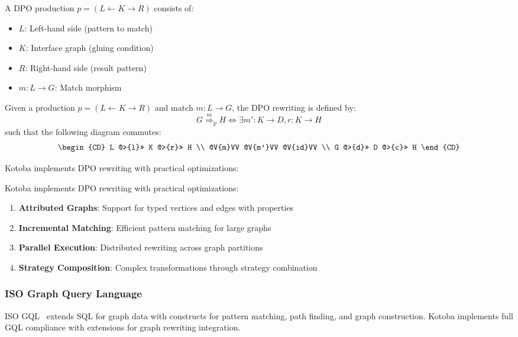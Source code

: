 \documentclass[11pt,a4paper]{article}
\begin{document}
\begin{definition}
A DPO production $p = (L \leftarrow K \rightarrow R)$ consists of:
\begin{itemize}
\item $L$: Left-hand side (pattern to match)
\item $K$: Interface graph (gluing condition)
\item $R$: Right-hand side (result pattern)
\item $m: L \rightarrow G$: Match morphism
\end{itemize}
\end{definition}

\begin{theorem}
Given a production $p = (L \leftarrow K \rightarrow R)$ and match $m: L \rightarrow G$, the DPO rewriting is defined by:
\[
G \overset{m}{\Rightarrow}_{p} H \iff \exists m': K \rightarrow D, r: K \rightarrow H
\]
such that the following diagram commutes:
\[
\begin{CD}
L @>{l}>> K @>{r}>> H \\
@V{m}VV @V{m'}VV @V{id}VV \\
G @>{d}>> D @>{c}>> H
\end{CD}
\]
\end{theorem}

Kotoba implements DPO rewriting with practical optimizations:

Kotoba implements DPO rewriting with practical optimizations:
\begin{enumerate}
\item \textbf{Attributed Graphs}: Support for typed vertices and edges with properties
\item \textbf{Incremental Matching}: Efficient pattern matching for large graphs
\item \textbf{Parallel Execution}: Distributed rewriting across graph partitions
\item \textbf{Strategy Composition}: Complex transformations through strategy combination
\end{enumerate}

\subsubsection{ISO Graph Query Language}
\label{subsubsec:gql}

ISO GQL~\cite{iso_gql} extends SQL for graph data with constructs for pattern matching, path finding, and graph construction. Kotoba implements full GQL compliance with extensions for graph rewriting integration.
\end{document}
